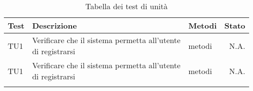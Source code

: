 \begin{longtable}{llXr}%
\toprule
\textbf{Test} & \textbf{Descrizione} & \textbf{Metodi} & \textbf{Stato}\\
\toprule
TU1&Verificare che il sistema permetta all'utente di registrarsi&metodi&N.A.\\
\midrule
TU1&Verificare che il sistema permetta all'utente di registrarsi&metodi&N.A.\\
\bottomrule
\caption{Tabella dei test di unità}
\end{longtable}